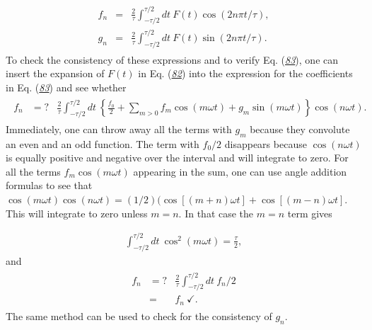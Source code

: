 \documentclass[letterpaper,10pt,english]{sphinxmanual}
\begin{document}
\begin{equation*}
\begin{split}
\begin{eqnarray}
\label{eq:fourierdef2} \tag{83}
f_n&=&\frac{2}{\tau}\int_{-\tau/2}^{\tau/2} dt~F(t)\cos(2n\pi t/\tau),\\
\nonumber
g_n&=&\frac{2}{\tau}\int_{-\tau/2}^{\tau/2} dt~F(t)\sin(2n\pi t/\tau).
\end{eqnarray}
\end{split}
\end{equation*}
To check the consistency of these expressions and to verify
Eq. ({\hyperref[\detokenize{chapter1:eq:fourierdef2}]{\emph{83}}}), one can insert the expansion of \(F(t)\) in
Eq. ({\hyperref[\detokenize{chapter1:eq:fourierdef1}]{\emph{82}}}) into the expression for the coefficients in
Eq. ({\hyperref[\detokenize{chapter1:eq:fourierdef2}]{\emph{83}}}) and see whether
\begin{equation*}
\begin{split}
\begin{eqnarray}
f_n&=?&\frac{2}{\tau}\int_{-\tau/2}^{\tau/2} dt~\left\{
\frac{f_0}{2}+\sum_{m>0}f_m\cos(m\omega t)+g_m\sin(m\omega t)
\right\}\cos(n\omega t).
\end{eqnarray}
\end{split}
\end{equation*}
Immediately, one can throw away all the terms with \(g_m\) because they
convolute an even and an odd function. The term with \(f_0/2\)
disappears because \(\cos(n\omega t)\) is equally positive and negative
over the interval and will integrate to zero. For all the terms
\(f_m\cos(m\omega t)\) appearing in the sum, one can use angle addition
formulas to see that \(\cos(m\omega t)\cos(n\omega
t)=(1/2)(\cos[(m+n)\omega t]+\cos[(m-n)\omega t]\). This will integrate
to zero unless \(m=n\). In that case the \(m=n\) term gives




\begin{equation*}
\begin{split}
\begin{equation}
\int_{-\tau/2}^{\tau/2}dt~\cos^2(m\omega t)=\frac{\tau}{2},
\label{_auto63} \tag{84}
\end{equation}
\end{split}
\end{equation*}
and
\begin{equation*}
\begin{split}
\begin{eqnarray}
f_n&=?&\frac{2}{\tau}\int_{-\tau/2}^{\tau/2} dt~f_n/2\\
\nonumber
&=&f_n~\checkmark.
\end{eqnarray}
\end{split}
\end{equation*}
The same method can be used to check for the consistency of \(g_n\).
\end{document}
